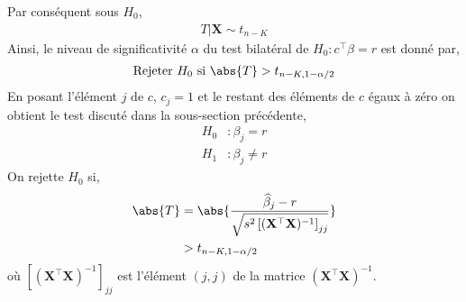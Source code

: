 Par conséquent sous $H_0$,
\begin{align*}
T | \mathbf{X}\sim t_{n-K}
\end{align*}
Ainsi, le niveau de significativité $\alpha$ du test bilatéral de $H_0: c^\top\beta = r$ est donné par,
\begin{align*}
\textrm{Rejeter} \ H_0 \ \textrm{si} \ \abs{T} > t_{n-K, 1-\alpha/2}
\end{align*}
En posant l'élément $j$ de $c$, $c_j=1$ et le restant des éléments de $c$ égaux à zéro on obtient le test discuté dans la sous-section précédente,
\begin{align*}
H_0&: \beta_j = r\\
H_1&:\beta_j \neq r
\end{align*}
On rejette $H_0$ si,
\begin{align*}
\abs{T} &= \abs{ \frac{\widehat{\beta}_j - r}{\sqrt{s^2\left[(\mathbf{X}^\top\mathbf{X})^{-1}\right]_{jj}}}}\\
&> t_{n-K, 1-\alpha/2}
\end{align*}
où $\left[(\mathbf{X}^\top\mathbf{X})^{-1}\right]_{jj}$ est l'élément $(j,j)$ de la matrice $(\mathbf{X}^\top\mathbf{X})^{-1}$.

